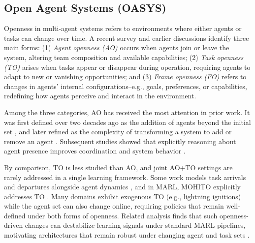 






\subsection{Open Agent Systems (OASYS)}\label{oasys}

Openness in multi-agent systems refers to environments where either agents or tasks can change over time. A recent survey \cite{aimag_eck} and earlier discussions \cite{Shehory00,Calmet04,Jumadinov14} identify three main forms: (1) \emph{Agent openness (AO)} occurs when agents join or leave the system, altering team composition and available capabilities; (2) \emph{Task openness (TO)} arises when tasks appear or disappear during operation, requiring agents to adapt to new or vanishing opportunities; and (3) \emph{Frame openness (FO)} refers to changes in agents' internal configurations--e.g., goals, preferences, or capabilities, redefining how agents perceive and interact in the environment. 

Among the three categories, AO has received the most attention in prior work. It was first defined over two decades ago as the addition of agents beyond the initial set \cite{original-omas}, and later refined as the complexity of transforming a system to add or remove an agent \cite{Jamroga13}. Subsequent studies showed that explicitly reasoning about agent presence improves coordination and system behavior \cite{Chandrasekaran,cohen2017open,aimag_eck,Kakarlapudi22}. 


By comparison, TO is less studied than AO, and joint AO+TO settings are rarely addressed in a single learning framework. Some work models task arrivals and departures alongside agent dynamics \cite{jumadinova2013strategic,chen2016collaborative}, and in MARL, MOHITO explicitly addresses TO \cite{anilmohito}. Many domains exhibit exogenous TO (e.g., lightning ignitions) while the agent set can also change online, requiring policies that remain well-defined under both forms of openness. Related analysis finds that such openness-driven changes can destabilize learning signals under standard MARL pipelines, motivating architectures that remain robust under changing agent and task sets \cite{abadi2025challenges}.




